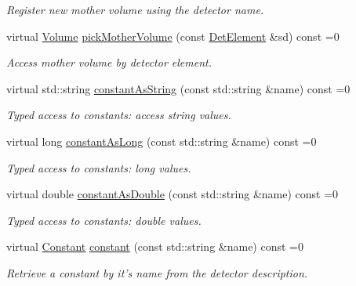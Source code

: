 \begin{DoxyCompactItemize}
\begin{DoxyCompactList}\small\item\em Register new mother volume using the detector name. \item\end{DoxyCompactList}\item 
virtual \hyperlink{class_d_d4hep_1_1_geometry_1_1_volume}{Volume} \hyperlink{class_d_d4hep_1_1_geometry_1_1_l_c_d_d_ad239fb24b7d6eb41abf697f2710ad6a3}{pickMotherVolume} (const \hyperlink{class_d_d4hep_1_1_geometry_1_1_det_element}{DetElement} \&sd) const =0
\begin{DoxyCompactList}\small\item\em Access mother volume by detector element. \item\end{DoxyCompactList}\item 
virtual std::string \hyperlink{class_d_d4hep_1_1_geometry_1_1_l_c_d_d_a6857611520c86f1d242a1698ab5c181f}{constantAsString} (const std::string \&name) const =0
\begin{DoxyCompactList}\small\item\em Typed access to constants: access string values. \item\end{DoxyCompactList}\item 
virtual long \hyperlink{class_d_d4hep_1_1_geometry_1_1_l_c_d_d_a95370880f4063064af089b943b0e4ce2}{constantAsLong} (const std::string \&name) const =0
\begin{DoxyCompactList}\small\item\em Typed access to constants: long values. \item\end{DoxyCompactList}\item 
virtual double \hyperlink{class_d_d4hep_1_1_geometry_1_1_l_c_d_d_a9696a0bb5af8abd3667460a617d4dc83}{constantAsDouble} (const std::string \&name) const =0
\begin{DoxyCompactList}\small\item\em Typed access to constants: double values. \item\end{DoxyCompactList}\item 
virtual \hyperlink{class_d_d4hep_1_1_geometry_1_1_constant}{Constant} \hyperlink{class_d_d4hep_1_1_geometry_1_1_l_c_d_d_a636bc57de8b0334a83c52ef2b43c465d}{constant} (const std::string \&name) const =0
\begin{DoxyCompactList}\small\item\em Retrieve a constant by it's name from the detector description. \item\end{DoxyCompactList}\item 

\end{DoxyCompactItemize}
